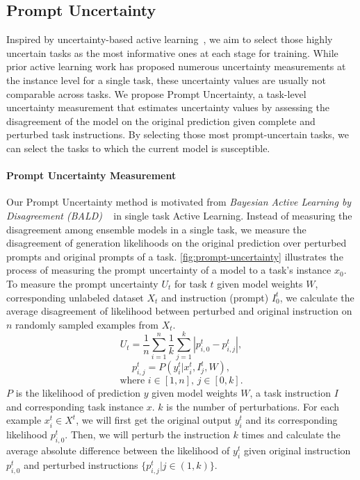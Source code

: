 \subsection{Prompt Uncertainty}
Inspired by uncertainty-based active learning~\citep{siddhant-lipton-2018-deep}, we aim to select those highly uncertain tasks as the most informative ones at each stage for training.
While prior active learning work has proposed numerous uncertainty measurements at the instance level for a single task, these uncertainty values are usually not comparable across tasks. We propose Prompt Uncertainty, a task-level uncertainty measurement that estimates uncertainty values by assessing the disagreement of the model on the original prediction given complete and perturbed task instructions. 
By selecting those most prompt-uncertain tasks, we can select the tasks to which the current model is susceptible.

\paragraph{Prompt Uncertainty Measurement}
Our Prompt Uncertainty method is motivated from \textit{Bayesian Active Learning by Disagreement (BALD)} ~\cite{houlsby2011bayesian} in single task Active Learning.
Instead of measuring the disagreement among ensemble models in a single task, we measure the disagreement of generation likelihoods on the original prediction over perturbed prompts and original prompts of a task.
\autoref{fig:prompt-uncertainty} illustrates the process of measuring the prompt uncertainty of a model to a task's instance $x_0$.
To measure the prompt uncertainty $U_{t}$ for task $t$ given model weights $W$, corresponding unlabeled dataset $X_t$ and instruction (prompt) $I^t_{0}$, we calculate the average disagreement of likelihood between perturbed and original instruction on $n$ randomly sampled examples from $X_t$. 
\[
U_t = \frac{1}{n}\sum_{i=1}^{n}\frac{1}{k}\sum_{j=1}^{k} |p^t_{i,0} - p^t_{i,j}|,
\]
\[
p^t_{i,j}\!=\! P(y^t_i|x^t_{i}, I^t_{j}, W),
\]
\[
\text{where } i \in [1,n] \text{, } j \in [0, k]. 
\]
$P$ is the likelihood of prediction $y$ given model weights $W$, a task instruction $I$ and corresponding task instance $x$. $k$ is the number of perturbations.
For each example $x^{t}_{i} \in X^t$, we will first get the original output $y^t_i$ and its corresponding likelihood $p^t_{i,0}$. Then, we will perturb the instruction $k$ times and calculate the average absolute difference between the likelihood of $y^t_i$ given original instruction $p^t_{i,0}$ and perturbed instructions $\{p^t_{i,j} \vert j \in (1, k)\}$. 

